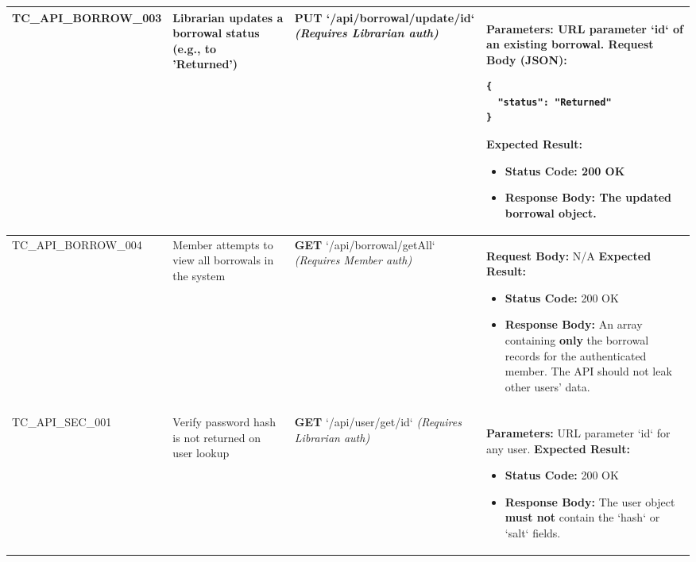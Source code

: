 \begin{longtable}{|>{\scriptsize\raggedright\arraybackslash}p{2.5cm}|>{\raggedright\arraybackslash}p{3cm}|>{\raggedright\arraybackslash}p{4cm}|>{\raggedright\arraybackslash}p{6.5cm}|}
TC\_API\_BORROW\_003 & Librarian updates a borrowal status (e.g., to 'Returned') & \textbf{PUT} \newline `/api/borrowal/update/{id}`  \newline \textit{(Requires Librarian auth)} & \textbf{Parameters:} URL parameter `id` of an existing borrowal. \newline
\textbf{Request Body (JSON):}
\begin{lstlisting}
{
  "status": "Returned"
}
\end{lstlisting}
\textbf{Expected Result:}
\begin{itemize}[noitemsep, topsep=0pt, leftmargin=*]
    \item \textbf{Status Code:} 200 OK
    \item \textbf{Response Body:} The updated borrowal object.
\end{itemize} \\ \hline

TC\_API\_BORROW\_004 & Member attempts to view all borrowals in the system & \textbf{GET} \newline `/api/borrowal/getAll`  \newline \textit{(Requires Member auth)} & \textbf{Request Body:} N/A \newline
\textbf{Expected Result:}
\begin{itemize}[noitemsep, topsep=0pt, leftmargin=*]
    \item \textbf{Status Code:} 200 OK
    \item \textbf{Response Body:} An array containing \textbf{only} the borrowal records for the authenticated member. The API should not leak other users' data. 
\end{itemize} \\ \hline

\multicolumn{4}{|l|}{\textbf{Sub-Section: Security \& Input Validation}} \\ \hline
TC\_API\_SEC\_001 & Verify password hash is not returned on user lookup & \textbf{GET} \newline `/api/user/get/{id}`  \newline \textit{(Requires Librarian auth)} & \textbf{Parameters:} URL parameter `id` for any user. \newline
\textbf{Expected Result:}
\begin{itemize}[noitemsep, topsep=0pt, leftmargin=*]
    \item \textbf{Status Code:} 200 OK
    \item \textbf{Response Body:} The user object \textbf{must not} contain the `hash` or `salt` fields. 
\end{itemize} \\ \hline


\end{longtable}
